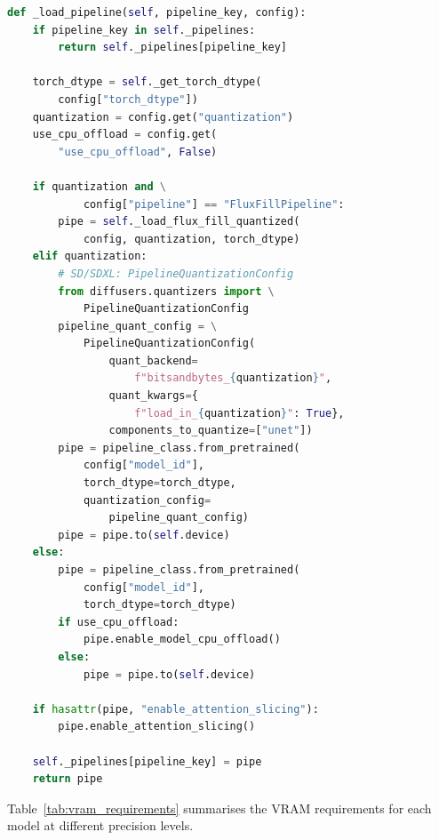 \documentclass[12pt,a4paper]{report}
\begin{document}
\begin{lstlisting}[language=Python, caption={General pipeline loading with caching (\texttt{diffusion.py})}, label={lst:load_pipeline}]
def _load_pipeline(self, pipeline_key, config):
    if pipeline_key in self._pipelines:
        return self._pipelines[pipeline_key]

    torch_dtype = self._get_torch_dtype(
        config["torch_dtype"])
    quantization = config.get("quantization")
    use_cpu_offload = config.get(
        "use_cpu_offload", False)

    if quantization and \
            config["pipeline"] == "FluxFillPipeline":
        pipe = self._load_flux_fill_quantized(
            config, quantization, torch_dtype)
    elif quantization:
        # SD/SDXL: PipelineQuantizationConfig
        from diffusers.quantizers import \
            PipelineQuantizationConfig
        pipeline_quant_config = \
            PipelineQuantizationConfig(
                quant_backend=
                    f"bitsandbytes_{quantization}",
                quant_kwargs={
                    f"load_in_{quantization}": True},
                components_to_quantize=["unet"])
        pipe = pipeline_class.from_pretrained(
            config["model_id"],
            torch_dtype=torch_dtype,
            quantization_config=
                pipeline_quant_config)
        pipe = pipe.to(self.device)
    else:
        pipe = pipeline_class.from_pretrained(
            config["model_id"],
            torch_dtype=torch_dtype)
        if use_cpu_offload:
            pipe.enable_model_cpu_offload()
        else:
            pipe = pipe.to(self.device)

    if hasattr(pipe, "enable_attention_slicing"):
        pipe.enable_attention_slicing()

    self._pipelines[pipeline_key] = pipe
    return pipe
\end{lstlisting}

Table~\ref{tab:vram_requirements} summarises the VRAM requirements for each model at different precision levels.
\end{document}
